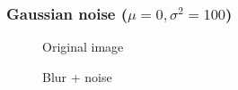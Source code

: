 \pagebreak
\subsubsection{Gaussian noise ($\mu = 0, \sigma^2 = 100$)}

\begin{figure}[!htb]\centering
    \begin{minipage}{0.45\textwidth}
        \caption{\small{Original image}}
    \end{minipage}
    \begin{minipage}{0.45\textwidth}
        \caption{\small{Blur + noise}}
    \end{minipage}
\end{figure}

